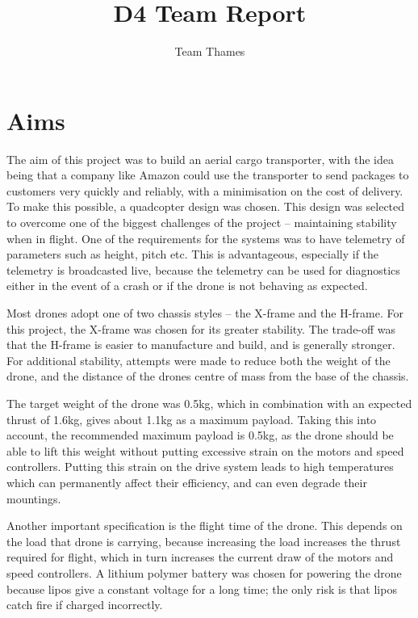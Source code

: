 \documentclass[a4paper]{article}
\title{\textbf{D4} Team Report}
\author{Team Thames}
\begin{document}
\maketitle
\tableofcontents
\pagebreak

\section{Aims}

The aim of this project was to build an aerial cargo transporter, with the idea being that a company like Amazon could use the transporter to send packages to customers very quickly and reliably, with a minimisation on the cost of delivery. To make this possible, a quadcopter design was chosen. This design was selected to overcome one of the biggest challenges of the project – maintaining stability when in flight. One of the requirements for the systems was to have telemetry of parameters such as height, pitch etc. This is advantageous, especially if the telemetry is broadcasted live, because the telemetry can be used for diagnostics either in the event of a crash or if the drone is not behaving as expected.

Most drones adopt one of two chassis styles – the X-frame and the H-frame. For this project, the X-frame was chosen for its greater stability. The trade-off was that the H-frame is easier to manufacture and build, and is generally stronger. For additional stability, attempts were made to reduce both the weight of the drone, and the distance of the drones centre of mass from the base of the chassis.

The target weight of the drone was 0.5kg, which in combination with an expected thrust of 1.6kg, gives about 1.1kg as a maximum payload. Taking this into account, the recommended maximum payload is 0.5kg, as the drone should be able to lift this weight without putting excessive strain on the motors and speed controllers. Putting this strain on the drive system leads to high temperatures which can permanently affect their efficiency, and can even degrade their mountings.

Another important specification is the flight time of the drone. This depends on the load that drone is carrying, because increasing the load increases the thrust required for flight, which in turn increases the current draw of the motors and speed controllers. A lithium polymer battery was chosen for powering the drone because lipos give a constant voltage for a long time; the only risk is that lipos catch fire if charged incorrectly.
\end{document}
